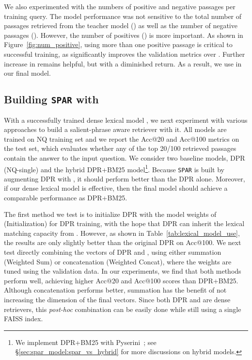 \documentclass[11pt]{article}
\newcommand{\spar}{\texttt{SPAR}\xspace}
\newcommand{\lexmodelsymbol}{\xspace}
\newcommand{\secref}[1]{\S\ref{#1}}
\begin{document}
We also experimented with the numbers of positive and negative passages per training query. 
The model performance was not sensitive to the total number of passages retrieved from the teacher model () as well as the number of negative passages ().
However, the number of positives () is more important.
As shown in Figure~\ref{fig:num_positive}, using more than one positive passage is critical to successful training, as  significantly improves the validation metrics over .
Further increase in  remains helpful, but with a diminished return. As a result, we use  in our final model.

\subsection{Building \spar{} with \lexmodelsymbol{}}\label{sec:spar_model:use}

With a successfully trained dense lexical model \lexmodelsymbol{}, we next experiment with various approaches to build a salient-phrase aware retriever with it.
All models are trained on NQ training set and we report the Acc@20 and Acc@100 metrics on the test set, which evaluates whether any of the top 20/100 retrieved passages contain the answer to the input question.
We consider two baseline models, DPR (NQ-single) and the hybrid DPR+BM25 model\footnote{We implement DPR+BM25 with Pyserini~\cite{pyserini}; see \secref{sec:spar_model:spar_vs_hybrid} for more discussions on hybrid models.}.
Because \spar{} is built by augmenting DPR with \lexmodelsymbol, it should perform better than the DPR alone.
Moreover, if our dense lexical model is effective, then the final model should achieve a comparable performance as DPR+BM25.

The first method we test is to initialize DPR with the model weights of \lexmodelsymbol (Initialization) for DPR training, with the hope that DPR can inherit the lexical matching capacity from \lexmodelsymbol{}. However, as shown in Table~\ref{tab:lexical_model_use}, the results are only slightly better than the original DPR on Acc@100.
We next test directly combining the vectors of DPR and \lexmodelsymbol, using either summation (Weighted Sum) or concatenation (Weighted Concat), where the weights are tuned using the validation data.
In our experiments, we find that both methods perform well, achieving higher Acc@20 and Acc@100 scores than DPR+BM25. 
Although concatenation performs better, summation has the benefit of not increasing the dimension of the final vectors.
Since both DPR and \lexmodelsymbol{} are dense retrievers, this \emph{post-hoc} combination can be easily done while still using a single FAISS index.
\end{document}
